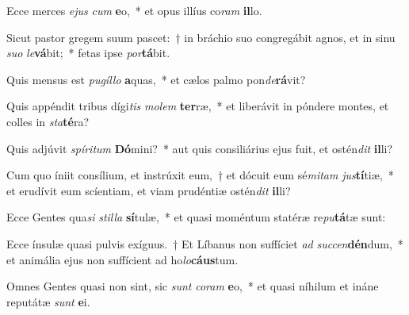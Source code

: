 \item Ecce merces \textit{e}\textit{jus} \textit{cum} \textbf{e}o,~* et opus illíus co\textit{ram} \textbf{il}lo.
\item Sicut pastor gregem suum pascet:~† in bráchio suo congregábit agnos, et in sinu \textit{su}\textit{o} \textit{le}\textbf{vá}bit;~* fetas ipse \textit{por}\textbf{tá}bit.
\item Quis mensus est \textit{pu}\textit{gíl}\textit{lo} \textbf{a}quas,~* et cælos palmo pon\textit{de}\textbf{rá}vit?
\item Quis appéndit tribus dígi\textit{tis} \textit{mo}\textit{lem} \textbf{ter}ræ,~* et liberávit in póndere montes, et colles in \textit{sta}\textbf{té}ra?
\item Quis adjúvit \textit{spí}\textit{ri}\textit{tum} \textbf{Dó}mini?~* aut quis consiliárius ejus fuit, et ostén\textit{dit} \textbf{il}li?
\item Cum quo íniit consílium, et instrúxit eum,~† et dócuit eum sé\textit{mi}\textit{tam} \textit{jus}\textbf{tí}tiæ,~* et erudívit eum scíentiam, et viam prudéntiæ ostén\textit{dit} \textbf{il}li?
\item Ecce Gentes qua\textit{si} \textit{stil}\textit{la} \textbf{sí}tulæ,~* et quasi moméntum statéræ re\textit{pu}\textbf{tá}tæ sunt:
\item Ecce ínsulæ quasi pulvis exíguus.~† Et Líbanus non suffíciet \textit{ad} \textit{suc}\textit{cen}\textbf{dén}dum,~* et animália ejus non suffícient ad ho\textit{lo}\textbf{cáus}tum.
\item Omnes Gentes quasi non sint, sic \textit{sunt} \textit{co}\textit{ram} \textbf{e}o,~* et quasi níhilum et ináne reputátæ \textit{sunt} \textbf{e}i.
